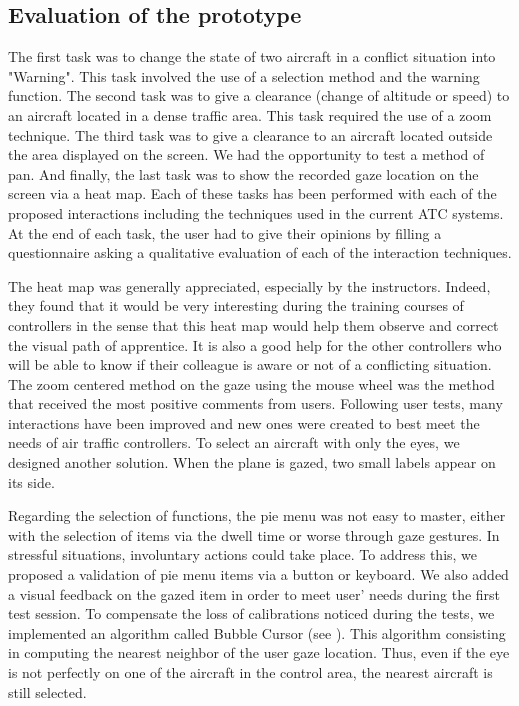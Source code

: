 \subsection{Evaluation of the prototype}
The first task was to change the state of two aircraft in a
conflict situation into "Warning". This task involved the use
of a selection method and the warning function. The second
task was to give a clearance (change of altitude or speed) to
an aircraft located in a dense traffic area. This task required
the use of a zoom technique. The third task was to give a
clearance to an aircraft located outside the area displayed on
the screen. We had the opportunity to test a method of pan.
And finally, the last task was to show the recorded gaze
location on the screen via a heat map.
Each of these tasks has been performed with each of the
proposed interactions including the techniques used in the
current ATC systems. At the end of each task, the user had
to give their opinions by filling a questionnaire asking a
qualitative evaluation of each of the interaction techniques.

The heat map was generally appreciated, especially by the
instructors. Indeed, they found that it would be very
interesting during the training courses of controllers in the
sense that this heat map would help them observe and
correct the visual path of apprentice. It is also a good help
for the other controllers who will be able to know if their
colleague is aware or not of a conflicting situation. The
zoom centered method on the gaze using the mouse wheel
was the method that received the most positive comments
from users.
Following user tests, many interactions have been improved
and new ones were created to best meet the needs of air
traffic controllers. To select an aircraft with only the eyes,
we designed another solution. When the plane is gazed, two
small labels appear on its side.

Regarding the selection of functions, the pie menu was not
easy to master, either with the selection of items via the
dwell time or worse through gaze gestures. In stressful
situations, involuntary actions could take place. To address
this, we proposed a validation of pie menu items via a button
or keyboard. We also added a visual feedback on the gazed
item in order to meet user' needs during the first test
session.
To compensate the loss of calibrations noticed during the
tests, we implemented an algorithm called Bubble Cursor  (see
\cite{Grossman:2005:BCE:1054972.1055012}). This algorithm consisting in computing the nearest
neighbor of the user gaze location. Thus, even if the eye is
not perfectly on one of the aircraft in the control area, the
nearest aircraft is still selected.
